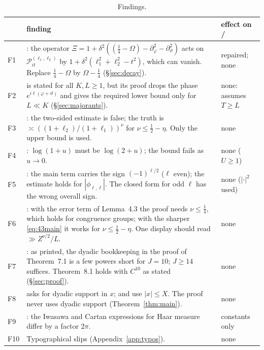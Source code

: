 \documentclass[11pt]{amsart}
\theoremstyle{remark}
\theoremstyle{definition}
\numberwithin{equation}{section}
\newcommand{\Pc}{\mathcal{P}}
\begin{document}
\begin{table}[h]
\centering
\small
\begin{tabularx}{\textwidth}{@{}lXl@{}}
\toprule
& finding & effect on \cite{GM1} / \cite{II}\\
\midrule
F1 & \cite[Prop.~5.1]{GM1}: the operator $\Xi=1+\delta^2((\tfrac14-\Omega)-\partial_\varphi^2-\partial_\vartheta^2)$ acts on $\Pc^{(\ell_1,\ell_2)}_{it}$ by $1+\delta^2(\ell_1^2+\ell_2^2-t^2)$, which can vanish. Replace $\tfrac14-\Omega$ by $\Omega-\tfrac14$ (\S\ref{sec:decay}). & repaired; none\\
F2 & \cite[Prop.~6.1]{GM0} is stated for all $K,L\ge1$, but its proof drops the phase $e^{i\ell(\varphi+\vartheta)}$ and gives the required lower bound only for $L\ll K$ (\S\ref{sec:majorants}). & none: \cite{GM1} assumes $T\ge L$\\
F3 & \cite[(2.36)]{GM1}: the two-sided estimate is false; the truth is $\asymp((1+\ell_2)/(1+\ell_1))^{\nu}$ for $\nu\le\frac12-\eta$. Only the upper bound is used. & none\\
F4 & \cite[Lemma~4.2]{GM1}: $\log(1+u)$ must be $\log(2+u)$; the bound fails as $u\to0$. & none ($U\ge1$)\\
F5 & \cite[Lemma~4.3]{GM1}: the main term carries the sign $(-1)^{\ell/2}$ ($\ell$ even); the estimate holds for $|\phi_{\ell,\ell}|$. The closed form for odd $\ell$ has the wrong overall sign. & none ($|\cdot|^2$ used)\\
F6 & \cite[Prop.~6.2]{GM1}: with the error term of Lemma~4.3 the proof needs $\nu\le\frac14$, which holds for congruence groups; with the sharper \eqref{eq:43main} it works for $\nu\le\frac12-\eta$. One display should read $\gg Z^{\nu/2}/L$. & none\\
F7 & \cite[\S\S7.3--7.4]{GM1}: as printed, the dyadic bookkeeping in the proof of Theorem~7.1 is a few powers short for $J=10$; $J\ge14$ suffices. Theorem~8.1 holds with $C^{10}$ as stated (\S\ref{sec:proof}). & none\\
F8 & \cite[Thm.~8.1]{GM1} asks for dyadic support in $x$; \cite[Thm.~2.1]{GM2} and \cite{II} use $|x|\le X$. The proof never uses dyadic support (Theorem~\ref{thm:main}). & none\\
F9 & \cite[(2.14)]{GM1}: the Iwasawa and Cartan expressions for Haar measure differ by a factor $2\pi$. & constants only\\
F10 & Typographical slips (Appendix~\ref{app:typos}). & none\\
\bottomrule
\end{tabularx}
\caption{Findings.}\label{tab:findings}
\end{table}
\end{document}
